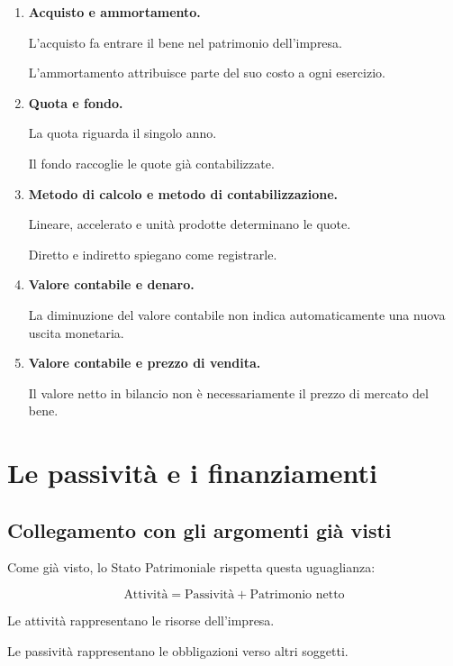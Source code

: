\begin{enumerate}
    \item \textbf{Acquisto e ammortamento.}

    L'acquisto fa entrare il bene
    nel patrimonio dell'impresa.

    L'ammortamento attribuisce
    parte del suo costo a ogni esercizio.

    \item \textbf{Quota e fondo.}

    La quota riguarda il singolo anno.

    Il fondo raccoglie
    le quote già contabilizzate.

    \item \textbf{Metodo di calcolo
    e metodo di contabilizzazione.}

    Lineare, accelerato e unità prodotte
    determinano le quote.

    Diretto e indiretto
    spiegano come registrarle.

    \item \textbf{Valore contabile e denaro.}

    La diminuzione del valore contabile
    non indica automaticamente
    una nuova uscita monetaria.

    \item \textbf{Valore contabile
    e prezzo di vendita.}

    Il valore netto in bilancio
    non è necessariamente
    il prezzo di mercato del bene.
\end{enumerate}

\section{Le passività e i finanziamenti}

\subsection*{Collegamento con gli argomenti già visti}

\noindent Come già visto,
lo Stato Patrimoniale rispetta
questa uguaglianza:

\[
\boxed{
\text{Attività}
=
\text{Passività}
+
\text{Patrimonio netto}
}
\]

\noindent Le attività rappresentano
le risorse dell'impresa.

\noindent Le passività rappresentano
le obbligazioni verso altri soggetti.

